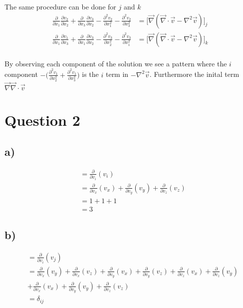 \documentclass[paper=a4, fontsize=12pt]{scrartcl}
\begin{document}
The same procedure can be done for $j$ and $k$ 
\begin{align*}
\frac{\partial}{\partial x_1}\frac{\partial v_2}{\partial x_2} 
+ \frac{\partial}{\partial x_3}\frac{\partial v_3}{\partial x_2} 
- \frac{\partial ^2 v_2}{\partial x_1^2} 
-\frac{\partial^2 v_2}{\partial x_3^2} 
&= \big[\vec{\nabla}(\vec{\nabla} \cdot \vec{v} - \nabla^2 \vec{v})\big]_j\\
\frac{\partial}{\partial x_1}\frac{\partial v_1}{\partial x_3} 
+ \frac{\partial}{\partial x_1}\frac{\partial v_3}{\partial x_2} 
- \frac{\partial ^2 v_3}{\partial x_2^2} 
-\frac{\partial^2 v_3}{\partial x_1^2} 
&= \big[\vec{\nabla}(\vec{\nabla} \cdot \vec{v} - \nabla^2 \vec{v})\big]_k\\
\end{align*}

By observing each component of the solution we see a pattern where the $i$ component
 $-\big(\frac{\partial ^2 v_1}{\partial x^2_2} + \frac{\partial ^2 v_1}{\partial x^2_3} \big)$ is the $i$ term in $-\nabla^2 \vec{v}$.
Furthermore the inital term $\vec{\nabla}\vec{\nabla} \cdot \vec{v}$


\section*{Question 2}
\subsection*{a)}
\begin{align*}
&=\frac{\partial}{\partial v_i}(v_i)\\
&= 
	\frac{\partial}{\partial v_x}(v_x) 
	+ \frac{\partial}{\partial v_y}(v_y)    
	+ \frac{\partial}{\partial v_z}(v_z)\\
& = 
	1 
	+ 1
	+ 1\\
& = 3	
\end{align*}	
\subsection*{b)}
\begin{align*}
&=\frac{\partial}{\partial v_i}(v_j)\\
&= 
\frac{\partial}{\partial v_x}(v_y) 
+ \frac{\partial}{\partial v_x}(v_z)    
+ \frac{\partial}{\partial v_y}(v_x)
+ \frac{\partial}{\partial v_y}(v_z)
+ \frac{\partial}{\partial v_z}(v_x)
+ \frac{\partial}{\partial v_z}(v_y)\\
&+ \frac{\partial}{\partial v_x} (v_x) 
+ \frac{\partial}{\partial v_y} (v_y) 
+ \frac{\partial}{\partial v_z} (v_z) 
\\
&= \delta _{ij}
\end{align*}
\end{document}
